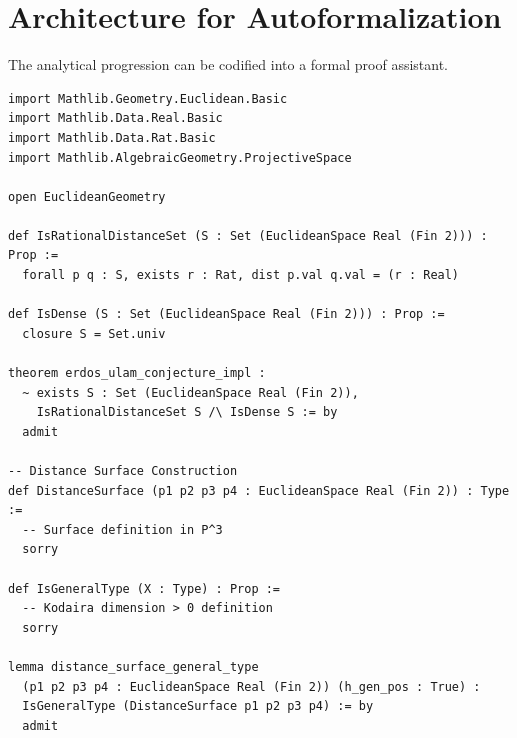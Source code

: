 \documentclass[12pt,a4paper]{article}
\begin{document}
\section{Architecture for Autoformalization}

The analytical progression can be codified into a formal proof assistant.

\begin{lstlisting}[basicstyle=\ttfamily\small, breaklines=true]
import Mathlib.Geometry.Euclidean.Basic
import Mathlib.Data.Real.Basic
import Mathlib.Data.Rat.Basic
import Mathlib.AlgebraicGeometry.ProjectiveSpace

open EuclideanGeometry

def IsRationalDistanceSet (S : Set (EuclideanSpace Real (Fin 2))) : Prop :=
  forall p q : S, exists r : Rat, dist p.val q.val = (r : Real)

def IsDense (S : Set (EuclideanSpace Real (Fin 2))) : Prop :=
  closure S = Set.univ

theorem erdos_ulam_conjecture_impl :
  ~ exists S : Set (EuclideanSpace Real (Fin 2)),
    IsRationalDistanceSet S /\ IsDense S := by
  admit

-- Distance Surface Construction
def DistanceSurface (p1 p2 p3 p4 : EuclideanSpace Real (Fin 2)) : Type :=
  -- Surface definition in P^3
  sorry

def IsGeneralType (X : Type) : Prop :=
  -- Kodaira dimension > 0 definition
  sorry

lemma distance_surface_general_type
  (p1 p2 p3 p4 : EuclideanSpace Real (Fin 2)) (h_gen_pos : True) :
  IsGeneralType (DistanceSurface p1 p2 p3 p4) := by
  admit
\end{lstlisting}
\end{document}
